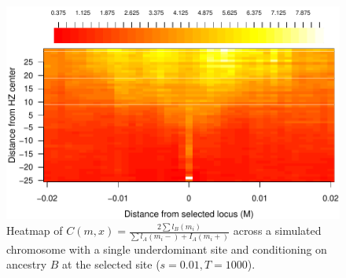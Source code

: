 \begin{figure}
\includegraphics{figs/ratioAdjacentBlocksAlongChromHeatmapAncBConditioning.pdf}
    \caption{Heatmap of $C(m,x)=\frac{2\sum{l_B(m_i)}}{\sum{l_A(m_i-)+I_A(m_i+)}}$ across a simulated chromosome with a single underdominant site and conditioning on ancestry $B$ at the selected site ($s=0.01, T=1000$). }\label{Supp:ratioBlockAdjacentHeatmap}
\end{figure}


